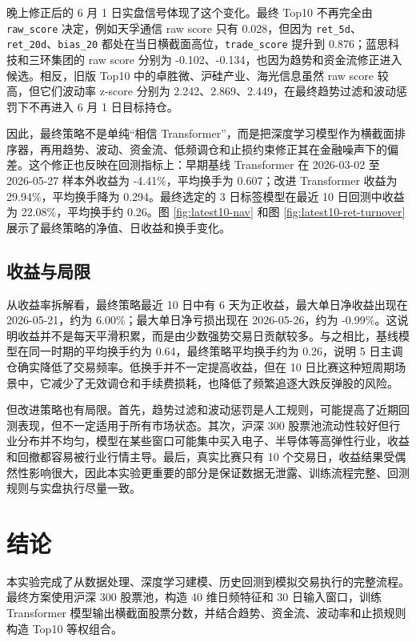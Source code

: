 \documentclass[fontset=mac]{ctexart}
\begin{document}
晚上修正后的 6 月 1 日实盘信号体现了这个变化。最终 Top10 不再完全由 \verb|raw_score| 决定，例如天孚通信 raw score 只有 0.028，但因为 \verb|ret_5d|、\verb|ret_20d|、\verb|bias_20| 都处在当日横截面高位，\verb|trade_score| 提升到 0.876；蓝思科技和三环集团的 raw score 分别为 -0.102、-0.134，也因为趋势和资金流修正进入候选。相反，旧版 Top10 中的卓胜微、沪硅产业、海光信息虽然 raw score 较高，但它们波动率 z-score 分别为 2.242、2.869、2.449，在最终趋势过滤和波动惩罚下不再进入 6 月 1 日目标持仓。

因此，最终策略不是单纯“相信 Transformer”，而是把深度学习模型作为横截面排序器，再用趋势、波动、资金流、低频调仓和止损约束修正其在金融噪声下的偏差。这个修正也反映在回测指标上：早期基线 Transformer 在 2026-03-02 至 2026-05-27 样本外收益为 -4.41\%，平均换手为 0.607；改进 Transformer 收益为 29.94\%，平均换手降为 0.294。最终选定的 3 日标签模型在最近 10 日回测中收益为 22.08\%，平均换手约 0.26。图 \ref{fig:latest10-nav} 和图 \ref{fig:latest10-ret-turnover} 展示了最终策略的净值、日收益和换手变化。

\subsection{收益与局限}

从收益率拆解看，最终策略最近 10 日中有 6 天为正收益，最大单日净收益出现在 2026-05-21，约为 6.00\%；最大单日净亏损出现在 2026-05-26，约为 -0.99\%。这说明收益并不是每天平滑积累，而是由少数强势交易日贡献较多。与之相比，基线模型在同一时期的平均换手约为 0.64，最终策略平均换手约为 0.26，说明 5 日主调仓确实降低了交易频率。低换手并不一定提高收益，但在 10 日比赛这种短周期场景中，它减少了无效调仓和手续费损耗，也降低了频繁追逐大跌反弹股的风险。

但改进策略也有局限。首先，趋势过滤和波动惩罚是人工规则，可能提高了近期回测表现，但不一定适用于所有市场状态。其次，沪深 300 股票池流动性较好但行业分布并不均匀，模型在某些窗口可能集中买入电子、半导体等高弹性行业，收益和回撤都容易被行业行情主导。最后，真实比赛只有 10 个交易日，收益结果受偶然性影响很大，因此本实验更重要的部分是保证数据无泄露、训练流程完整、回测规则与实盘执行尽量一致。

\section{结论}

本实验完成了从数据处理、深度学习建模、历史回测到模拟交易执行的完整流程。最终方案使用沪深 300 股票池，构造 40 维日频特征和 30 日输入窗口，训练 Transformer 模型输出横截面股票分数，并结合趋势、资金流、波动率和止损规则构造 Top10 等权组合。
\end{document}
